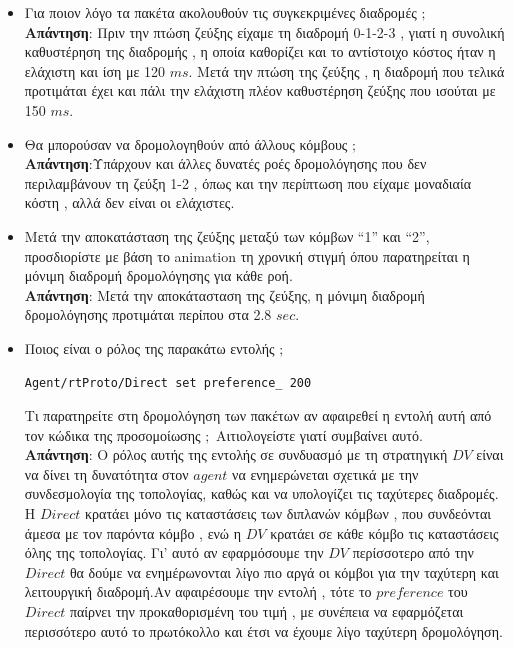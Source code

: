 \documentclass{article}%
\begin{document}
\begin{itemize}
\begin{figure}[htbp]
\end{figure}

\item Για ποιον λόγο τα πακέτα ακολουθούν τις συγκεκριμένες διαδρομές $;$\\ 
\textbf{Απάντηση}: Πριν την πτώση ζεύξης είχαμε τη διαδρομή 0-1-2-3 , γιατί η συνολική καθυστέρηση της διαδρομής , η οποία καθορίζει και το αντίστοιχο κόστος ήταν η ελάχιστη και ίση με 120 $ms$. Μετά την πτώση της ζεύξης , η διαδρομή που τελικά προτιμάται έχει και πάλι την ελάχιστη πλέον καθυστέρηση ζεύξης που ισούται με 150 $ms$.
\item Θα μπορούσαν να δρομολογηθούν από άλλους κόμβους $;$\\ 
\textbf{Απάντηση}:Υπάρχουν και άλλες δυνατές ροές δρομολόγησης που δεν περιλαμβάνουν τη ζεύξη 1-2 , όπως και την περίπτωση που είχαμε μοναδιαία κόστη , αλλά δεν είναι οι ελάχιστες.
\item Μετά την αποκατάσταση της ζεύξης μεταξύ των κόμβων “1” και “2”, προσδιορίστε με
βάση το \textlatin{animation} τη χρονική στιγμή όπου παρατηρείται η μόνιμη διαδρομή
δρομολόγησης για κάθε ροή. \\
\textbf{Απάντηση}: Μετά την αποκάτασταση της ζεύξης, η μόνιμη διαδρομή δρομολόγησης προτιμάται περίπου στα 2.8 $sec$.
\item Ποιος είναι ο ρόλος της παρακάτω εντολής $;$ \begin{verbatim}Agent/rtProto/Direct set preference_ 200 \end{verbatim} 
Τι παρατηρείτε στη δρομολόγηση των πακέτων αν αφαιρεθεί η εντολή αυτή από τον
κώδικα της προσομοίωσης $;$ Αιτιολογείστε γιατί συμβαίνει αυτό. \\
\textbf{Απάντηση}: Ο ρόλος αυτής της εντολής σε συνδυασμό με τη στρατηγική $DV$ είναι να δίνει τη δυνατότητα στον $agent$ να ενημερώνεται σχετικά με την συνδεσμολογία της τοπολογίας, καθώς και να υπολογίζει τις ταχύτερες διαδρομές. Η $Direct$ κρατάει μόνο τις καταστάσεις των διπλανών κόμβων , που συνδεόνται άμεσα με τον παρόντα κόμβο , ενώ η $DV$ κρατάει σε κάθε κόμβο τις καταστάσεις όλης της τοπολογίας. Γι' αυτό αν εφαρμόσουμε την $DV$ περίσσοτερο από την $Direct$ θα δούμε να ενημέρωνονται λίγο πιο αργά οι κόμβοι για την ταχύτερη και λειτουργική διαδρομή.Αν αφαιρέσουμε την εντολή , τότε το $preference$ του $Direct$ παίρνει την προκαθορισμένη του τιμή , με συνέπεια να εφαρμόζεται περισσότερο αυτό το πρωτόκολλο και έτσι να έχουμε λίγο ταχύτερη δρομολόγηση.\end{itemize}
\end{document}
